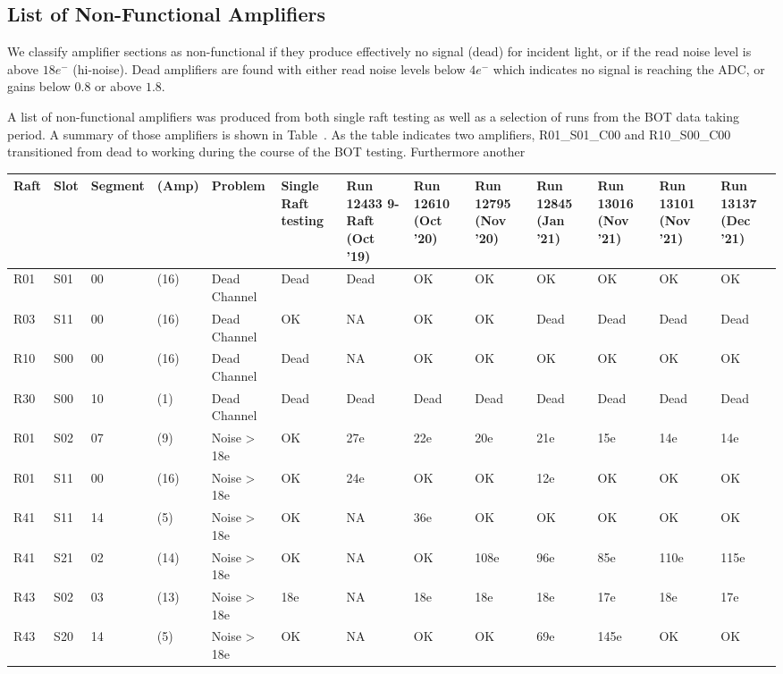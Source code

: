 \subsection{List of Non-Functional Amplifiers}\label{deadamplifiers}

We classify amplifier sections as non-functional if they produce effectively no signal (dead) for incident light, or if the read noise level is above $18e^{-}$ (hi-noise).  Dead amplifiers are found with either read noise levels below $4e^{-}$ which indicates no signal is reaching the ADC, or gains below $0.8$ or above $1.8$. 

A list of non-functional amplifiers was produced from both single raft testing as well as a selection of runs from the BOT data taking period. A summary of those amplifiers is shown in Table~\cite{tab-BOTdeadamp}. As the table indicates two amplifiers, R01\_S01\_C00 and R10\_S00\_C00 transitioned from dead to working during the course of the BOT testing. Furthermore another 

\begin{table}[!ht]
    \centering
    \begin{tabular}{|l|l|l|l|l|l|l|l|l|l|l|l|l|}
    \hline
        Raft & Slot & Segment & (Amp) & Problem & Single Raft testing & Run 12433 9-Raft (Oct '19) & Run 12610 (Oct '20) & Run 12795 (Nov '20) & Run 12845 (Jan '21) & Run 13016 (Nov '21) & Run 13101 (Nov '21) & Run 13137 (Dec '21) \\ \hline
        R01 & S01 & 00 & (16) & Dead Channel & Dead & Dead & OK & OK & OK & OK & OK & OK \\ \hline
        R03 & S11 & 00 & (16) & Dead Channel & OK & NA & OK & OK & Dead & Dead & Dead & Dead \\ \hline
        R10 & S00 & 00 & (16) & Dead Channel & Dead & NA & OK & OK & OK & OK & OK & OK \\ \hline
        R30 & S00 & 10 & (1) & Dead Channel & Dead & Dead & Dead & Dead & Dead & Dead & Dead & Dead \\ \hline
        R01 & S02 & 07 & (9) & Noise > 18e & OK & 27e & 22e & 20e & 21e & 15e & 14e & 14e \\ \hline
        R01 & S11 & 00 & (16) & Noise > 18e & OK & 24e & OK & OK & 12e & OK & OK & OK \\ \hline
        R41 & S11 & 14 & (5) & Noise > 18e & OK & NA & 36e & OK & OK & OK & OK & OK \\ \hline
        R41 & S21 & 02 & (14) & Noise > 18e & OK & NA & OK & 108e & 96e & 85e & 110e & 115e \\ \hline
        R43 & S02 & 03 & (13) & Noise > 18e & 18e & NA & 18e & 18e & 18e & 17e & 18e & 17e \\ \hline
        R43 & S20 & 14 & (5) & Noise > 18e & OK & NA & OK & OK & 69e & 145e & OK & OK \\ \hline

    \end{tabular}
\end{table}


